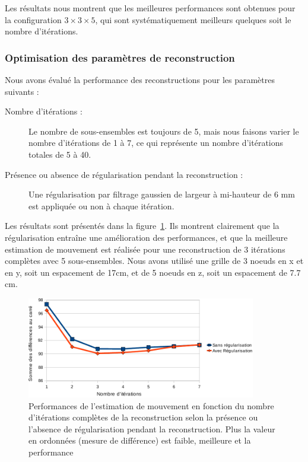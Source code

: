 Les résultats nous montrent que les meilleures performances sont obtenues pour la configuration $3 \times 3 \times 5$, qui sont systématiquement meilleurs quelques soit le nombre d’itérations.




\subsubsection{Optimisation des paramètres de reconstruction}

Nous avons évalué la performance des reconstructions pour les paramètres suivants :
\begin{description}
 \item[Nombre d'itérations :] Le nombre de sous-ensembles est toujours de 5, mais nous faisons varier le nombre d'itérations de 1 à 7, ce qui représente un nombre d'itérations totales de 5 à 40.
 \item[Présence ou absence de régularisation pendant la reconstruction :] Une régularisation par filtrage gaussien de largeur à mi-hauteur de 6 mm est appliquée ou non à chaque itération.
\end{description}

Les résultats sont présentés dans la figure~\ref{lab:perfsFctIterReg}. Ils montrent clairement que la régularisation entraîne une amélioration des performances, et que la meilleure estimation de mouvement est réalisée pour une reconstruction de 3 itérations complètes avec 5 sous-ensembles. Nous avons utilisé une grille de 3 noeuds en x et en y, soit un espacement de 17cm, et de 5 noeuds en z, soit un espacement de 7.7 cm.

\begin{figure}
\centering
\includegraphics[width=10cm]{images/perfsRecalageFctIter_crop}
\caption[Performances de l'estimation de mouvement en fonction de la régularisation]{Performances de l'estimation de mouvement en fonction du nombre d'itérations complètes de la reconstruction selon la présence ou l'absence de régularisation pendant la reconstruction. Plus la valeur en ordonnées (mesure de différence) est faible, meilleure et la performance}
\label{lab:perfsFctIterReg}
\end{figure}


